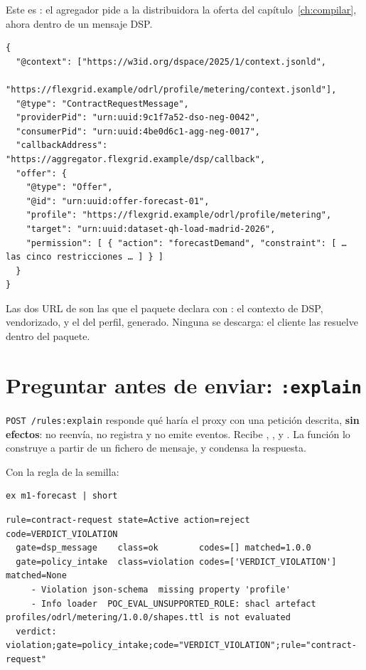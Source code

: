 Este es : el agregador pide a la distribuidora la oferta del
capítulo~\ref{ch:compilar}, ahora dentro de un mensaje DSP.

\begin{lstlisting}[style=json]
{
  "@context": ["https://w3id.org/dspace/2025/1/context.jsonld",
               "https://flexgrid.example/odrl/profile/metering/context.jsonld"],
  "@type": "ContractRequestMessage",
  "providerPid": "urn:uuid:9c1f7a52-dso-neg-0042",
  "consumerPid": "urn:uuid:4be0d6c1-agg-neg-0017",
  "callbackAddress": "https://aggregator.flexgrid.example/dsp/callback",
  "offer": {
    "@type": "Offer",
    "@id": "urn:uuid:offer-forecast-01",
    "profile": "https://flexgrid.example/odrl/profile/metering",
    "target": "urn:uuid:dataset-qh-load-madrid-2026",
    "permission": [ { "action": "forecastDemand", "constraint": [ … las cinco restricciones … ] } ]
  }
}
\end{lstlisting}

Las dos URL de  son las que el paquete declara con : el contexto de DSP, vendorizado, y
el del perfil, generado. Ninguna se descarga: el cliente las resuelve dentro del paquete.

\section{Preguntar antes de enviar: \texttt{:explain}}

\texttt{POST /\allowbreak{}rules:explain} responde qué haría el proxy con una petición descrita, \textbf{sin efectos}: no
reenvía, no registra y no emite eventos. Recibe , ,  y . La
función  lo construye a partir de un fichero de mensaje, y  condensa la respuesta.

Con la regla de la semilla:

\begin{lstlisting}[style=sh]
ex m1-forecast | short
\end{lstlisting}
\begin{lstlisting}[style=out]
rule=contract-request state=Active action=reject code=VERDICT_VIOLATION
  gate=dsp_message    class=ok        codes=[] matched=1.0.0
  gate=policy_intake  class=violation codes=['VERDICT_VIOLATION'] matched=None
     - Violation json-schema  missing property 'profile'
     - Info loader  POC_EVAL_UNSUPPORTED_ROLE: shacl artefact profiles/odrl/metering/1.0.0/shapes.ttl is not evaluated
  verdict: violation;gate=policy_intake;code="VERDICT_VIOLATION";rule="contract-request"
\end{lstlisting}

